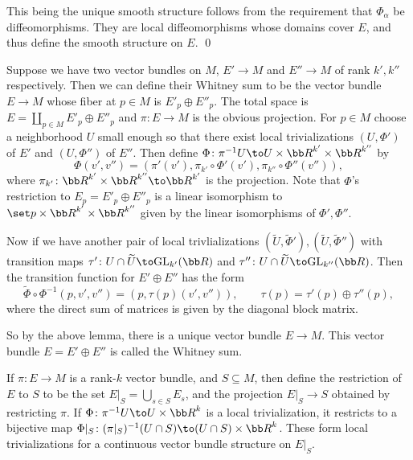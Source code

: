     This being the unique smooth structure follows from the requirement that $\Phi_\alpha$ be diffeomorphisms.
    They are local diffeomorphisms whose domains cover $E$, and thus define the smooth structure on $E$.
    \qed

\eproof

\bexam

    Suppose we have two vector bundles on $M$, $E'\to M$ and $E''\to M$ of rank $k',k''$ respectively.
    Then we can define their {\emphcolor Whitney sum} to be the vector bundle $E\to M$ whose fiber at $p\in M$ is $E'_p\oplus E''_p$.
    The total space is $E=\coprod_{p\in M}E'_p\oplus E''_p$ and $\pi\colon E\to M$ is the obvious projection.
    For $p\in M$ choose a neighborhood $U$ small enough so that there exist local trivializations $(U,\Phi')$ of $E'$ and $(U,\Phi'')$ of $E''$.
    Then define $\Phi\colon\pi^{-1}U\to U\times\bR^{k'}\times\bR^{k''}$ by
    $$ \Phi(v',v'') = (\pi'(v'),\pi_{k'}\circ\Phi'(v'),\pi_{k''}\circ\Phi''(v'')) , $$
    where $\pi_{k'}\colon\bR^{k'}\times\bR^{k''}\to\bR^{k'}$ is the projection.
    Note that $\Phi$'s restriction to $E_p=E'_p\oplus E''_p$ is a linear isomorphism to $\set p\times\bR^{k'}\times\bR^{k''}$ given by the linear isomorphisms
    of $\Phi',\Phi''$.

    Now if we have another pair of local trivlializations $(\tilde U,\tilde\Phi'),(\tilde U,\tilde\Phi'')$ with transition maps
    $\tau'\colon U\cap\tilde U\to\gl_{k'}(\bR)$ and $\tau''\colon U\cap\tilde U\to\gl_{k''}(\bR)$.
    Then the transition function for $E'\oplus E''$ has the form
    $$ \tilde\Phi\circ\Phi^{-1}(p,v',v'') = (p,\tau(p)(v',v'')),\qquad \tau(p) = \tau'(p)\oplus\tau''(p) , $$
    where the direct sum of matrices is given by the diagonal block matrix.

    So by the above lemma, there is a unique vector bundle $E\to M$.
    This vector bundle $E=E'\oplus E''$ is called the {\emphcolor Whitney sum}.

\eexam

\bexam

    If $\pi\colon E\to M$ is a rank-$k$ vector bundle, and $S\subseteq M$, then define the {\emphcolor restriction} of $E$ to $S$ to be
    the set $E|_S=\bigcup_{s\in S}E_s$, and the projection $E|_S\to S$ obtained by restricting $\pi$.
    If $\Phi\colon\pi^{-1}U\to U\times\bR^k$ is a local trivialization, it restricts to a bijective map $\Phi|_S\colon(\pi|_S)^{-1}(U\cap S)\to(U\cap S)\times\bR^k$.
    These form local trivializations for a continuous vector bundle structure on $E|_S$.

